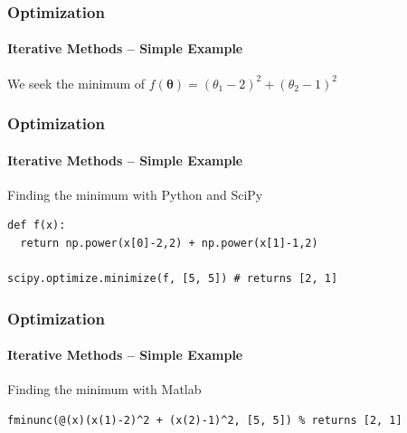 \documentclass[xetex,professionalfont]{beamer}
\newcommand{\bth}{\boldsymbol{\theta}}
\begin{document}

\begin{frame}[fragile]
\frametitle{Optimization}
\framesubtitle{Iterative Methods -- Simple Example}

We seek the minimum of $f(\bth)=(\theta_1-2)^2+(\theta_2-1)^2$ %

\bigskip
\begin{center}
\end{center}

\end{frame}


\begin{frame}[fragile]
\frametitle{Optimization}
\framesubtitle{Iterative Methods -- Simple Example}

Finding the minimum with Python and SciPy %

\bigskip
\begin{verbatim}
def f(x):
  return np.power(x[0]-2,2) + np.power(x[1]-1,2)

scipy.optimize.minimize(f, [5, 5]) # returns [2, 1]
\end{verbatim}

\end{frame}


\begin{frame}[fragile]
\frametitle{Optimization}
\framesubtitle{Iterative Methods -- Simple Example}

Finding the minimum with Matlab %

\bigskip
\begin{verbatim}
fminunc(@(x)(x(1)-2)^2 + (x(2)-1)^2, [5, 5]) % returns [2, 1]
\end{verbatim}

\end{frame}
\end{document}
